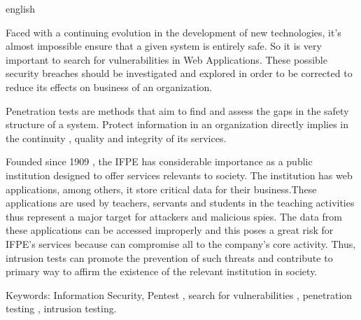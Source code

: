 \documentclass[
    12pt,               %
    openright,          %
    oneside,            %
    a4paper,            %
    section=TITLE,     %
    english,            %
    french,             %
    spanish,            %
    brazil              %
    ]{abntex2}
\newcommand{\citep}{\cite}
\begin{document}


\begin{resumo}[Abstract]
 \begin{otherlanguage*}{english}
   
   
   Faced with a continuing evolution in the development of new technologies, it's almost impossible ensure that a given system is entirely safe. So it is very important to search for vulnerabilities in Web Applications. These possible security breaches should be investigated and explored in order to be corrected to reduce its effects on business of an organization.

 
Penetration tests are methods that aim to find and assess the gaps in the safety structure of a system. Protect information in an organization directly implies in the continuity , quality and integrity of its services.


Founded since 1909 \citep{62952}, the IFPE has considerable importance as a public institution designed to offer services relevants to society. The institution has web applications, among others, it store critical data for their business.These applications are used by teachers, servants and students in the teaching activities thus represent a major target for attackers and malicious spies. The data from these applications can be accessed improperly and this poses a great risk for IFPE's services because can compromise all to the company's core activity. Thus, intrusion tests can promote the prevention of such threats and contribute to primary way to affirm the existence of the relevant institution in society.


























Keywords: Information Security, Pentest , search for vulnerabilities , penetration testing , intrusion testing.


 \end{otherlanguage*}
\end{resumo}



\end{document}
